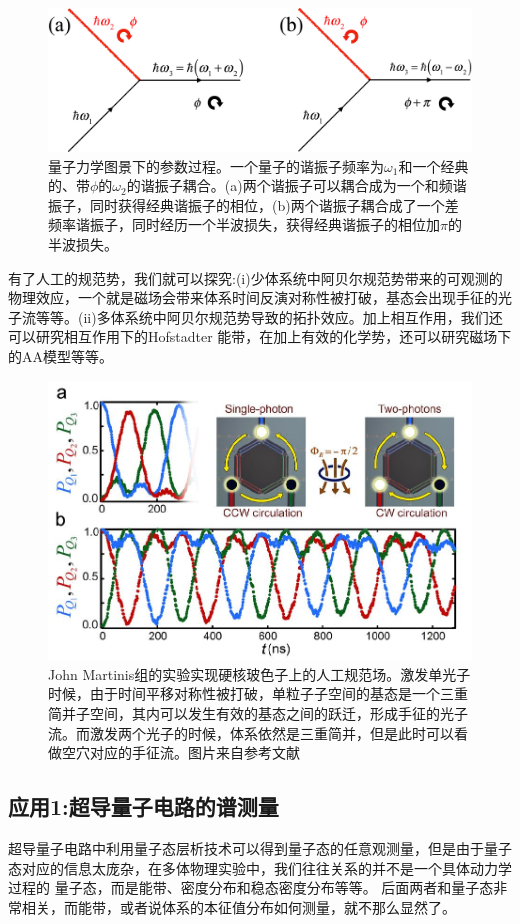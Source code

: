 \documentclass[supercite]{HustGraduPaper}
\begin{document}
\begin{figure}
	\centering
	\includegraphics[width=0.7\linewidth]{Figures/mine/Parametric}
	\caption{量子力学图景下的参数过程。一个量子的谐振子频率为$\omega_1$和一个经典的、带$\phi$的$\omega_2$的谐振子耦合。(a)两个谐振子可以耦合成为一个和频谐振子，同时获得经典谐振子的相位，(b)两个谐振子耦合成了一个差频率谐振子，同时经历一个半波损失，获得经典谐振子的相位加$\pi$的半波损失。}
	\label{fig:parametric}
\end{figure}
   有了人工的规范势，我们就可以探究:(i)少体系统中阿贝尔规范势带来的可观测的物理效应，一个就是磁场会带来体系时间反演对称性被打破，基态会出现手征的光子流等等。(ii)多体系统中阿贝尔规范势导致的拓扑效应。加上相互作用，我们还可以研究相互作用下的Hofstadter 能带\cite{scaffidi2014exact}，在加上有效的化学势\cite{hafezi2015chemical}，还可以研究磁场下的AA模型等等\cite{zhu2013topological,rousseau2006exact,lang2012edge}。
\begin{figure}
	\centering
	\includegraphics[width=0.7\linewidth]{Figures/topphoto/Roushan_NatPhys2016_Fig3}
	\caption{John Martinis组的实验实现硬核玻色子上的人工规范场。激发单光子时候，由于时间平移对称性被打破，单粒子子空间的基态是一个三重简并子空间，其内可以发生有效的基态之间的跃迁，形成手征的光子流。而激发两个光子的时候，体系依然是三重简并，但是此时可以看做空穴对应的手征流。图片来自参考文献\cite{Roushan2017a} }
	\label{fig:roushannatphys2016fig3}	
	
\end{figure}
   \subsection{应用1:超导量子电路的谱测量}
   超导量子电路中利用量子态层析技术可以得到量子态的任意观测量\cite{Roushan2017}，但是由于量子态对应的信息太庞杂，在多体物理实验中，我们往往关系的并不是一个具体动力学过程的
   量子态，而是能带、密度分布和稳态密度分布等等。 后面两者和量子态非常相关，而能带，或者说体系的本征值分布如何测量，就不那么显然了。
   
\end{document}
